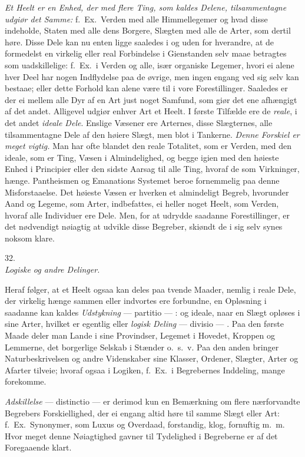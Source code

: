 \documentclass[12pt,a4paper]{article}
\newcommand{\logsec}[2]{%
  \bigskip\begin{center}{\large #1}\\[4pt]{\emph{#2}}\end{center}\smallskip}
\newcommand{\opage}[1]{\marginnote{\footnotesize\textit{[#1]}}}
\begin{document}
\noindent
\emph{Et Heelt er en Enhed, der med flere Ting, som kaldes Delene,
tilsammentagne udgiør det Samme:}
\opage{99} f.~Ex.\ Verden med alle Himmellegemer og hvad disse indeholde, Staten med alle
dens Borgere, Slægten med alle de Arter, som dertil høre. Disse Dele kan nu
enten ligge saaledes i og uden for hverandre, at de formedelst en virkelig
eller real Forbindelse i Gienstanden selv maae betragtes som uadskillelige:
f.~Ex.\ i Verden og alle, især organiske Legemer, hvori ei alene hver Deel har
nogen Indflydelse paa de øvrige, men ingen engang ved sig selv kan bestaae;
eller dette Forhold kan alene være til i vore Forestillinger. Saaledes er der
ei mellem alle Dyr af en Art just noget Samfund, som giør det ene afhængigt af
det andet. Alligevel udgiør enhver Art et Heelt. I første Tilfælde ere de
\emph{reale}, i det andet \emph{ideale Dele}. Enslige Væsener ere Arternes,
disse Slægternes, alle tilsammentagne Dele af den høiere Slægt, men blot i
Tankerne. \emph{Denne Forskiel er meget vigtig.} Man har ofte blandet den reale
Totalitet, som er Verden, med den ideale, som er Ting, Væsen i Almindelighed,
og begge igien med den høieste Enhed i Principier eller den sidste Aarsag til
alle Ting, hvoraf de som Virkninger, hænge. Pantheismen og Emanations Systemet
beroe fornemmelig paa denne Misforstaaelse. Det høieste Væsen er hverken et
almindeligt Begreb, hvorunder Aand og Legeme, som Arter, indbefattes, ei heller
noget Heelt, som Verden, hvoraf alle Individuer ere Dele. Men, for at udrydde
saadanne Forestillinger, er det nødvendigt
\opage{100} nøiagtig at udvikle disse Begreber, skiøndt de i sig selv synes noksom klare.

\logsec{32.}{Logiske og andre Delinger.}

\noindent
Heraf følger, at et Heelt ogsaa kan deles paa tvende Maader, nemlig i reale
Dele, der virkelig hænge sammen eller indvortes ere forbundne, en Opløsning i
saadanne kan kaldes \emph{Udstykning} --- partitio --- : og ideale, naar en
Slægt opløses i sine Arter, hvilket er egentlig eller \emph{logisk Deling} ---
divisio --- . Paa den første Maade deler man Lande i sine Provindser, Legemet i
Hovedet, Kroppen og Lemmerne, det borgerlige Selskab i Stænder o.~s.~v. Paa den
anden bringer Naturbeskrivelsen og andre Videnskaber sine Klasser, Ordener,
Slægter, Arter og Afarter tilveie; hvoraf ogsaa i Logiken, f.~Ex.\ i Begrebernes
Inddeling, mange forekomme.

\emph{Adskillelse} --- distinctio --- er derimod kun en Bemærkning om flere
nærforvandte Begrebers Forskiellighed, der ei engang altid høre til samme Slægt
eller Art: f.~Ex.\ Synonymer, som Luxus og Overdaad, forstandig, klog, fornuftig
m.~m. Hvor meget denne Nøiagtighed gavner til Tydelighed i Begreberne er af det
Foregaaende klart.
\end{document}
